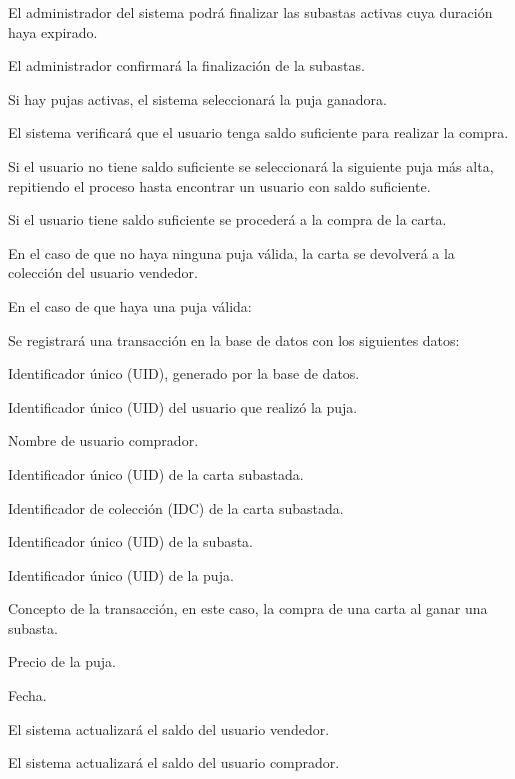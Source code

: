 \begin{RFSubastas}
	\item El administrador del sistema podrá finalizar las subastas activas cuya duración haya expirado.
	\begin{RFSubastas}
		\item El administrador confirmará la finalización de la subastas.
		\item Si hay pujas activas, el sistema seleccionará la puja ganadora.
		\begin{RFSubastas}
			\item El sistema verificará que el usuario tenga saldo suficiente para realizar la compra.
			\item Si el usuario no tiene saldo suficiente se seleccionará la siguiente puja más alta, repitiendo el proceso hasta encontrar un usuario con saldo suficiente.
			\item Si el usuario tiene saldo suficiente se procederá a la compra de la carta.
			\item En el caso de que no haya ninguna puja válida, la carta se devolverá a la colección del usuario vendedor.
			\item En el caso de que haya una puja válida:
			\begin{RFSubastas}
				\item Se registrará una transacción en la base de datos con los siguientes datos:
				\begin{RFSubastas}
					\item Identificador único (UID), generado por la base de datos.
					\item Identificador único (UID) del usuario que realizó la puja.
					\item Nombre de usuario comprador.
					\item Identificador único (UID) de la carta subastada.
					\item Identificador de colección (IDC) de la carta subastada.
					\item Identificador único (UID) de la subasta.
					\item Identificador único (UID) de la puja.
					\item Concepto de la transacción, en este caso, la compra de una carta al ganar una subasta.
					\item Precio de la puja.
					\item Fecha.
				\end{RFSubastas}
				\item El sistema actualizará el saldo del usuario vendedor.
				\item El sistema actualizará el saldo del usuario comprador.

\end{RFSubastas}
\end{RFSubastas}
\end{RFSubastas}
\end{RFSubastas}
